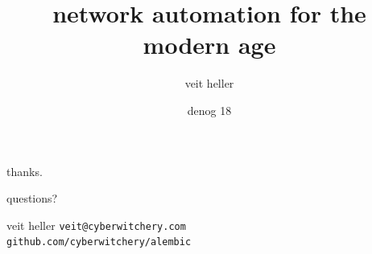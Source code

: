 \documentclass[aspectratio=169,14pt]{beamer}
\title{network automation for the modern age}
\author{veit heller}
\institute{cyberwitchery lab}
\date{denog 18}
\begin{document}
  {
  \begin{frame}[plain]
    \cwlogoright[cwGhost]{0.42\paperheight}%
    \titlepage
  \end{frame}}

  

  {
  \begin{frame}[plain]
    \cwlogoright[cwInk]{0.42\paperheight}%
    \paperheight
    \begin{minipage}{0.62\textwidth}
      {\color{cwInk}thanks.}\par\vskip12pt
      {\cwhanken\large\color{cwTeal}questions?}\par
      \paperheight
      {\cwhanken\color{cwMuted}veit heller \quad \texttt{veit@cyberwitchery.com}}\\[5pt]
      {\cwhanken\color{cwFaint}\texttt{github.com/cyberwitchery/alembic}}
    \end{minipage}
  \end{frame}}
\end{document}
